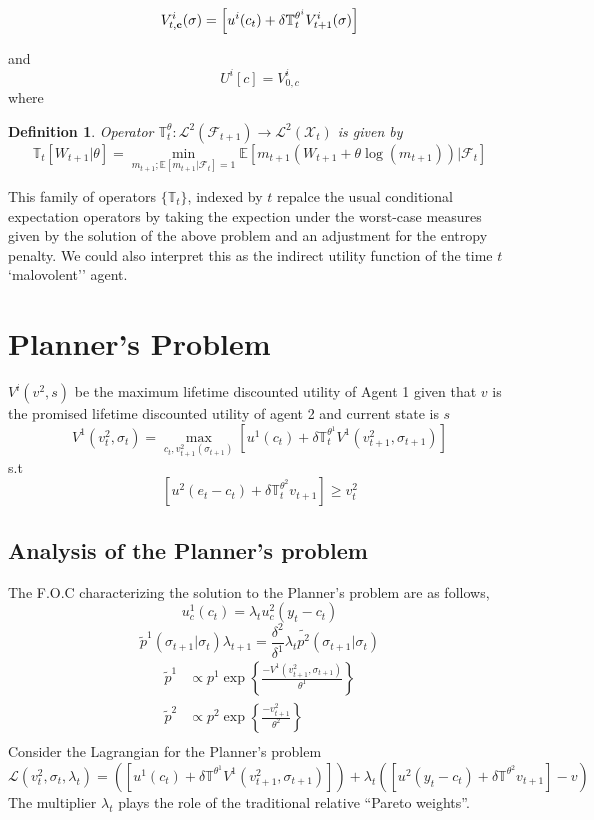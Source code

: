\documentclass[12pt]{article}
\newtheorem{definition}{Definition}
\begin{document}
\[V^i_{t,\text{\textbf{c}}}(\sigma)=\left[u^i(c_t)+\delta\mathbb{T}_t^{\theta^i} V^i_{t+1}(\sigma)\right]\]

and 
\[U^i[c]=V^i_{0,c}\]
where

\begin{definition}
Operator $\mathbb{T}^{\theta}_t : \mathcal{L}^2(\mathcal{F}_{t+1}) \to \mathcal{L}^2(\mathcal{X}_{t}) $ is given by
\[\mathbb{T}_t[W_{t+1}|\theta] = \min_{m_{t+1}; \mathbb{E}[m_{t+1}|\mathcal{F}_t]=1} \mathbb{E}\left[m_{t+1}\left( W_{t+1} +\theta \log(m_{t+1})\right)| \mathcal{F}_t\right] \]
\end{definition}
This family of operators $\{\mathbb{T}_t\}$, indexed by $t$  repalce the usual conditional expectation operators by taking the expection under the worst-case measures given by the solution of the above problem and an adjustment for the entropy penalty. We could also interpret this as the indirect utility function of the time $t$ `malovolent'' agent.


\section{Planner's Problem}

\noindent $V^i(v^2,s)$ be the maximum lifetime discounted utility of Agent 1 given that $v$ is the promised lifetime discounted utility of agent 2 and current state is $s$
%
\[V^1(v^2_t,\sigma_t)=\max_{c_t,v^2_{t+1}(\sigma_{t+1})} \left[u^1(c_t)+\delta \mathbb{T}_t^{\theta^1} V^1(v^2_{t+1},\sigma_{t+1})\right]\]
s.t
\[\left[u^2(e_t-c_t)+\delta \mathbb{T}_t^{\theta^2} v_{t+1}\right]\geq v^2_t\] 
%
 \subsection{Analysis of the Planner's problem}
 
 The F.O.C characterizing the solution to the Planner's problem are as follows,
\begin{equation}
u^1_c(c_t)=\lambda_t u^2_c(y_t-c_t)
\end{equation}
%
\begin{equation}
\tilde{p}^1(\sigma_{t+1} |\sigma_t)\lambda_{t+1}=\frac{\delta^2}{\delta^1}\lambda_t \tilde{p^2}(\sigma_{t+1} |\sigma_{t})
\end{equation}
%
\begin{subequations}
\begin{align}
\tilde{p}^1 & \propto p^1\exp\left\{\frac{-V^1(v^2_{t+1},\sigma_{t+1})}{\theta^1}\right\}\\
\tilde{p}^2 & \propto p^2\exp\left\{\frac{-v^2_{t+1}}{\theta^2}\right\}\\
\end{align}
\end{subequations}
Consider the Lagrangian for the Planner's problem
\[\mathcal{L}(v^2_t,\sigma_t,\lambda_t) = \left(\left[u^1(c_t)+\delta \mathbb{T}^{\theta^1} V^1(v^2_{t+1},\sigma_{t+1})\right]\right)+\lambda_t\left(\left[u^2(y_t-c_t)+\delta \mathbb{T}^{\theta^2} v_{t+1}\right]-v\right)\]
The multiplier $\lambda_t$ plays the role of the traditional relative ``Pareto weights''. 
\end{document}
